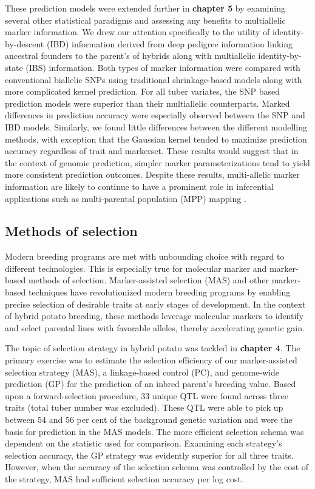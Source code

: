 \documentclass[
]{article}
\begin{document}
These prediction models were extended further in \textbf{chapter 5} by
examining several other statistical paradigms and assessing any benefits
to multiallelic marker information. We drew our attention specifically
to the utility of identity-by-descent (IBD) information derived from
deep pedigree information linking ancestral founders to the parent's of
hybrids along with multiallelic identity-by-state (IBS) information.
Both types of marker information were compared with conventional
biallelic SNPs using traditional shrinkage-based models along with more
complicated kernel prediction. For all tuber variates, the SNP based
prediction models were superior than their multiallelic counterparts.
Marked differences in prediction accuracy were especially observed
between the SNP and IBD models. Similarly, we found little differences
between the different modelling methods, with exception that the
Gaussian kernel tended to maximize prediction accuracy regardless of
trait and markerset. These results would suggest that in the context of
genomic prediction, simpler marker parameterizations tend to yield more
consistent prediction outcomes. Despite these results, multi-allelic
marker information are likely to continue to have a prominent role in
inferential applications such as multi-parental population (MPP) mapping
\autocite{Li2021a}.

\subsection{Methods of selection}\label{methods-of-selection}

Modern breeding programs are met with unbounding choice with regard to
different technologies. This is especially true for molecular marker and
marker-based methods of selection. Marker-assisted selection (MAS) and
other marker-based techniques have revolutionized modern breeding
programs by enabling precise selection of desirable traits at early
stages of development. In the context of hybrid potato breeding, these
methods leverage molecular markers to identify and select parental lines
with favorable alleles, thereby accelerating genetic gain.

The topic of selection strategy in hybrid potato was tackled in
\textbf{chapter 4}. The primary exercise was to estimate the selection
efficiency of our marker-assisted selection strategy (MAS), a
linkage-based control (PC), and genome-wide prediction (GP) for the
prediction of an inbred parent's breeding value. Based upon a
forward-selection procedure, 33 unique QTL were found across three
traits (total tuber number was excluded). These QTL were able to pick up
between 54 and 56 per cent of the background genetic variation and were
the basis for prediction in the MAS models. The more efficient selection
schema was dependent on the statistic used for comparison. Examining
each strategy's selection accuracy, the GP strategy was evidently
superior for all three traits. However, when the accuracy of the
selection schema was controlled by the cost of the strategy, MAS had
sufficient selection accuracy per log cost.
\end{document}
